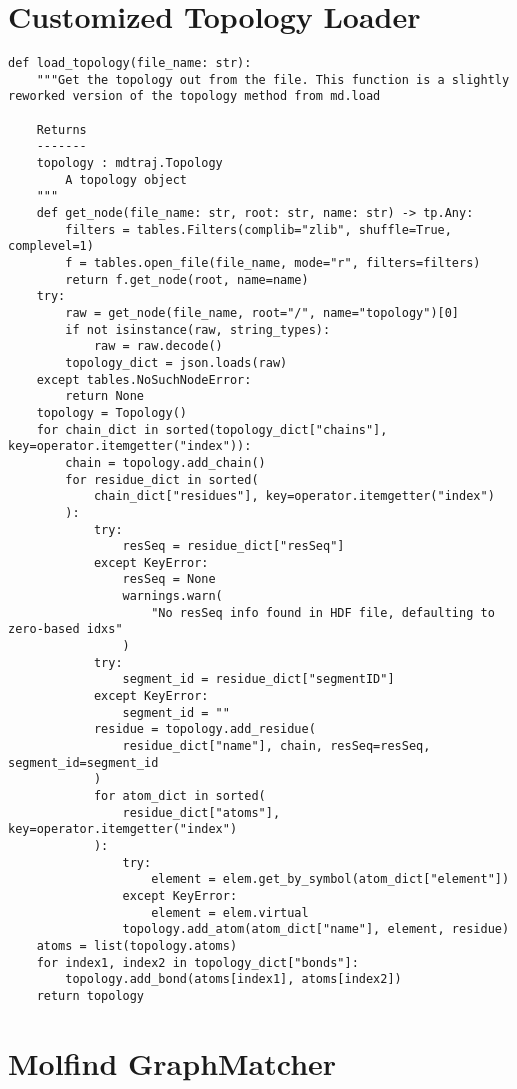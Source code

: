 \chapter{Customized Topology Loader}
\label{appendix:loader_function}

\begin{lstlisting}
def load_topology(file_name: str):
    """Get the topology out from the file. This function is a slightly reworked version of the topology method from md.load

    Returns
    -------
    topology : mdtraj.Topology
        A topology object
    """
    def get_node(file_name: str, root: str, name: str) -> tp.Any:
        filters = tables.Filters(complib="zlib", shuffle=True, complevel=1)
        f = tables.open_file(file_name, mode="r", filters=filters)
        return f.get_node(root, name=name)
    try:
        raw = get_node(file_name, root="/", name="topology")[0]
        if not isinstance(raw, string_types):
            raw = raw.decode()
        topology_dict = json.loads(raw)
    except tables.NoSuchNodeError:
        return None
    topology = Topology()
    for chain_dict in sorted(topology_dict["chains"], key=operator.itemgetter("index")):
        chain = topology.add_chain()
        for residue_dict in sorted(
            chain_dict["residues"], key=operator.itemgetter("index")
        ):
            try:
                resSeq = residue_dict["resSeq"]
            except KeyError:
                resSeq = None
                warnings.warn(
                    "No resSeq info found in HDF file, defaulting to zero-based idxs"
                )
            try:
                segment_id = residue_dict["segmentID"]
            except KeyError:
                segment_id = ""
            residue = topology.add_residue(
                residue_dict["name"], chain, resSeq=resSeq, segment_id=segment_id
            )
            for atom_dict in sorted(
                residue_dict["atoms"], key=operator.itemgetter("index")
            ):
                try:
                    element = elem.get_by_symbol(atom_dict["element"])
                except KeyError:
                    element = elem.virtual
                topology.add_atom(atom_dict["name"], element, residue)
    atoms = list(topology.atoms)
    for index1, index2 in topology_dict["bonds"]:
        topology.add_bond(atoms[index1], atoms[index2])
    return topology
\end{lstlisting}


\chapter{Molfind GraphMatcher}
\label{appendix:graph_matcher}

